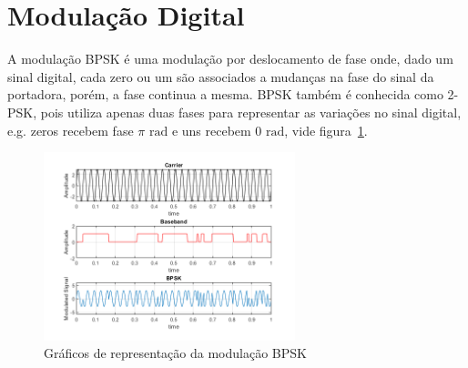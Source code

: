 \section{Modulação Digital}
\label{sec:bpsk}

A modulação BPSK é uma modulação por deslocamento de fase onde, dado um sinal digital, cada zero ou um são associados a mudanças na fase do sinal da portadora, porém, a fase continua a mesma.
BPSK também é conhecida como 2-PSK, pois utiliza apenas duas fases para representar as variações no sinal digital, e.g. zeros recebem fase $\pi \textrm{ rad}$ e uns recebem $0 \textrm{ rad}$, vide figura~\ref{fig:bpskplot}.

\begin{figure}[H]
    \centering
    \includegraphics[width=0.65\textwidth]{figures/bpskplot.png}
    \caption{Gráficos de representação da modulação BPSK}
    \label{fig:bpskplot}
\end{figure}
